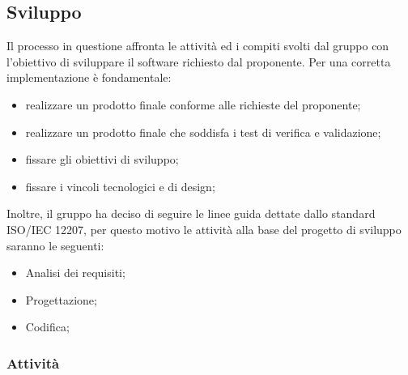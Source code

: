 \subsection{Sviluppo}
Il processo in questione affronta le attività ed i compiti svolti dal gruppo con l'obiettivo di sviluppare il software richiesto dal proponente. Per una corretta implementazione è fondamentale:
\begin{itemize}
		\item realizzare un prodotto finale conforme alle richieste del proponente; 	
		\item realizzare un prodotto finale che soddisfa i test di verifica e validazione; 	
		\item fissare gli obiettivi di sviluppo; 	
		\item fissare i vincoli tecnologici e di design; 	
\end{itemize}
Inoltre, il gruppo ha deciso di seguire le linee guida dettate dallo standard ISO/IEC 12207, per questo motivo le attività alla base del progetto di sviluppo saranno le seguenti:
\begin{itemize}
	\item Analisi dei requisiti; 	
	\item Progettazione;	
	\item Codifica; 	
\end{itemize}
\subsubsection{Attività}
